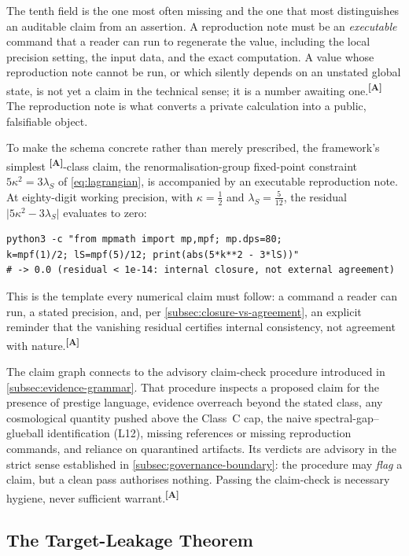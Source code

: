 \documentclass[12pt,a4paper,twoside]{article}
\theoremstyle{plain}
\theoremstyle{definition}
\theoremstyle{remark}
\newcommand{\catmark}[1]{\textsuperscript{\textsf{\textbf{[#1]}}}}
\begin{document}
\noindent The tenth field is the one most often missing and the one that most distinguishes an auditable claim from an assertion. A reproduction note must be an \emph{executable} command that a reader can run to regenerate the value, including the local precision setting, the input data, and the exact computation. A value whose reproduction note cannot be run, or which silently depends on an unstated global state, is not yet a claim in the technical sense; it is a number awaiting one.\catmark{A} The reproduction note is what converts a private calculation into a public, falsifiable object.

To make the schema concrete rather than merely prescribed, the framework's simplest \catmark{A}-class claim, the renormalisation-group fixed-point constraint $5\kappa^2 = 3\lambda_S$ of \cref{eq:lagrangian}, is accompanied by an executable reproduction note. At eighty-digit working precision, with $\kappa = \tfrac{1}{2}$ and $\lambda_S = \tfrac{5}{12}$, the residual $\lvert 5\kappa^2 - 3\lambda_S\rvert$ evaluates to zero:
\begin{verbatim}
python3 -c "from mpmath import mp,mpf; mp.dps=80;
k=mpf(1)/2; lS=mpf(5)/12; print(abs(5*k**2 - 3*lS))"
# -> 0.0 (residual < 1e-14: internal closure, not external agreement)
\end{verbatim}
This is the template every numerical claim must follow: a command a reader can run, a stated precision, and, per \cref{subsec:closure-vs-agreement}, an explicit reminder that the vanishing residual certifies internal consistency, not agreement with nature.\catmark{A}

The claim graph connects to the advisory claim-check procedure introduced in \cref{subsec:evidence-grammar}. That procedure inspects a proposed claim for the presence of prestige language, evidence overreach beyond the stated class, any cosmological quantity pushed above the Class~C cap, the naive spectral-gap--glueball identification (L12), missing references or missing reproduction commands, and reliance on quarantined artifacts. Its verdicts are advisory in the strict sense established in \cref{subsec:governance-boundary}: the procedure may \emph{flag} a claim, but a clean pass authorises nothing. Passing the claim-check is necessary hygiene, never sufficient warrant.\catmark{A}

\subsection{The Target-Leakage Theorem}
\label{subsec:target-leakage-theorem}
\end{document}
